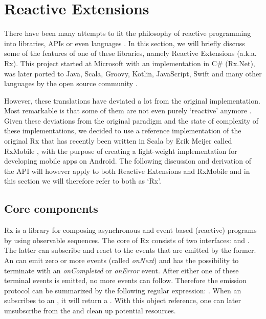 \section{Reactive Extensions}
There have been many attempts to fit the philosophy of reactive programming into libraries, APIs or even languages \cite{ReactiveX, meijer2015-Dart, Reactive-Streams, Akka, Elm, RxMobile}. In this section, we will briefly discuss some of the features of one of these libraries, namely Reactive Extensions (a.k.a. Rx). This project started at Microsoft with an implementation in C\# \cite{meijer2010-Observable} (Rx.Net), was later ported to Java, Scala, Groovy, Kotlin, JavaScript, Swift and many other languages by the open source community \cite{ReactiveX}.

However, these translations have deviated a lot from the original implementation. Most remarkable is that some of them are not even purely `reactive' anymore \cite{meijer2014-Derivation}. Given these deviations from the original paradigm and the state of complexity of these implementations, we decided to use a reference implementation of the original Rx that has recently been written in Scala by Erik Meijer called RxMobile \cite{RxMobile}, with the purpose of creating a light-weight implementation for developing mobile apps on Android. The following discussion and derivation of the API will however apply to both Reactive Extensions and RxMobile and in this section we will therefore refer to both as `Rx'.

\subsection{Core components}
\label{subsec:core-comps}
Rx is a library for composing asynchronous and event based (reactive) programs by using observable sequences. The core of Rx consists of two interfaces: \obs and \obv. The latter can subscribe and react to the events that are emitted by the former. An \obs can emit zero or more events (called \textit{onNext}) and has the possibility to terminate with an \textit{onCompleted} or \textit{onError} event. After either one of these terminal events is emitted, no more events can follow. Therefore the emission protocol can be summarized by the following regular expression:  \cite{MS2010-RxDesign}. When an \obv subscribes to an \obs,  it will return a \subs. With this object reference, one can later unsubscribe from the \obs and clean up potential resources.


